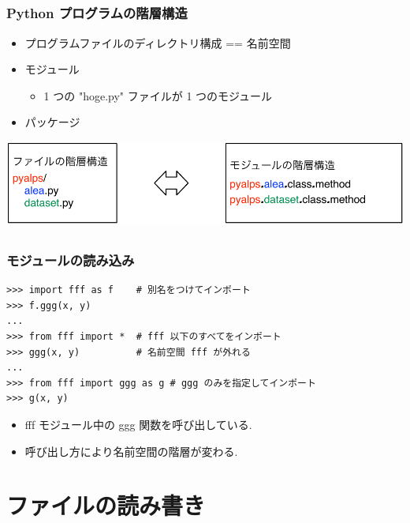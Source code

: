 \subsection*{\redm\whiteb\greenb}
\begin{frame}[t]
\frametitle{Python プログラムの階層構造}
\begin{itemize}
\item プログラムファイルのディレクトリ構成 == 名前空間
\item モジュール
\begin{itemize}
 \item 1 つの "hoge.py" ファイルが 1 つのモジュール
\end{itemize}
\item パッケージ
\end{itemize}
\includegraphics[width=\textwidth]{module.pdf}
\end{frame}

\subsection*{\redm\whiteb\greenb}
\begin{frame}[t,fragile]
\frametitle{モジュールの読み込み}
\begin{lstlisting}
>>> import fff as f    # 別名をつけてインポート
>>> f.ggg(x, y)
...
>>> from fff import *  # fff 以下のすべてをインポート
>>> ggg(x, y)          # 名前空間 fff が外れる
...
>>> from fff import ggg as g # ggg のみを指定してインポート
>>> g(x, y)
\end{lstlisting}
\begin{itemize}
\item fff モジュール中の ggg 関数を呼び出している. 
\item 呼び出し方により名前空間の階層が変わる. 
\end{itemize}
\end{frame}

\section{ファイルの読み書き}

